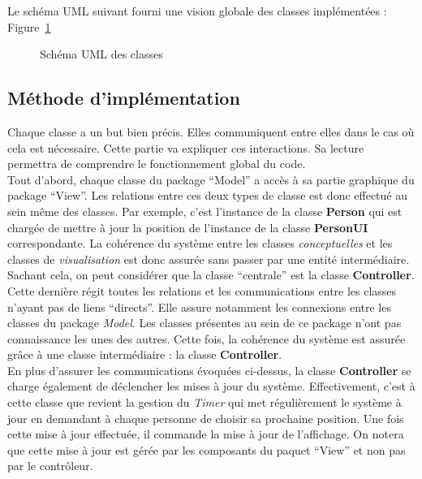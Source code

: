 	Le schéma UML suivant fourni une vision globale des classes implémentées : Figure~\ref{fig:uml}\\
	
	\begin{figure}[H]
	\centering
	
	\caption{Schéma UML des classes\label{fig:uml}}
	\end{figure}
	
	\subsection{Méthode d'implémentation}
	Chaque classe a un but bien précis. Elles communiquent entre elles dans le cas où cela est nécessaire. Cette partie va expliquer ces interactions. Sa lecture permettra de comprendre le fonctionnement global du code. \\
	
	Tout d'abord, chaque classe du package ``Model'' a accès à sa partie graphique du package ``View''. Les relations entre ces deux types de classe est donc effectué au sein même des classes. Par exemple, c'est l'instance de la classe \textbf{Person} qui est chargée de mettre à jour la position de l'instance de la classe \textbf{PersonUI} correspondante. La cohérence du système entre les classes \textit{conceptuelles} et les classes de \textit{visualisation} est donc assurée sans passer par une entité intermédiaire. \\
	
	Sachant cela, on peut considérer que la classe ``centrale'' est la classe \textbf{Controller}. Cette dernière régit toutes les relations et les communications entre les classes n'ayant pas de liens ``directs''. Elle assure notamment les connexions entre les classes du package \textit{Model}. Les classes présentes au sein de ce package n'ont pas connaissance les unes des autres. Cette fois, la cohérence du système est assurée grâce à une classe intermédiaire : la classe \textbf{Controller}.\\
	
	En plus d'assurer les communications évoquées ci-dessus, la classe \textbf{Controller} se charge également de déclencher les mises à jour du système. Effectivement, c'est à cette classe que revient la gestion du \textit{Timer} qui met régulièrement le système à jour en demandant à chaque personne de choisir sa prochaine position. Une fois cette mise à jour effectuée, il commande la mise à jour de l'affichage. On notera que cette mise à jour est gérée par les composants du paquet ``View'' et non pas par le contrôleur.
	
	